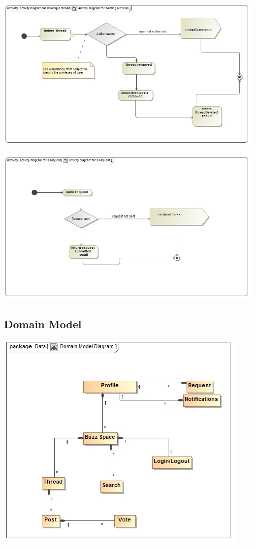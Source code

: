 \documentclass[12pt, oneside]{article}
\begin{document}
		  \includegraphics[scale=0.45]{deleteThreadNew}
		 \newline
		 
		  \includegraphics[scale=0.45]{requestNew}
		 \newline
		 
	\subsection{ Domain Model}
		\includegraphics[scale=1]{"Domain Model Diagram"}
\end{document}
